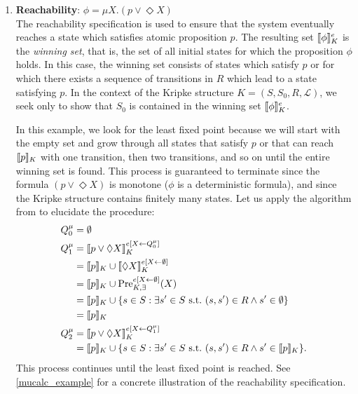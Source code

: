 \begin{enumerate}[label = (\roman*)]
    \item \textbf{Reachability}: $\phi = \mu X.(p \lor \Diamond X)$\label{reachability_example} \\
        The reachability specification is used to ensure that the system eventually reaches a state which satisfies atomic proposition $p$. The resulting set $\brackets{\phi}_K^e$ is the {\em winning set}, that is, the set of all initial states for which the proposition $\phi$ holds. In this case, the winning set consists of states which satisfy $p$ or for which there exists a sequence of transitions in $R$ which lead to a state satisfying $p$. In the context of the Kripke structure $K = (S,S_0,R,\mathcal{L})$, we seek only to show that $S_0$ is contained in the winning set $\brackets{\phi}_K^e$.

        In this example, we look for the least fixed point because we will start with the empty set and grow through all states that satisfy $p$ or that can reach $\brackets{p}_K$ with one transition, then two transitions, and so on until the entire winning set is found. This process is guaranteed to terminate since the formula $(p \lor \Diamond X)$ is monotone ($\phi$ is a deterministic \mucalc{} formula), and since the Kripke structure contains finitely many states. Let us apply the algorithm from  to elucidate the procedure:
        \begin{align*}
            Q_0^\mu &= \emptyset \\
            Q_1^\mu &= \brackets{p \lor \Diamond X}_K^{e[X \leftarrow Q_0^\mu]} \\
                    &= \brackets{p}_K \cup \brackets{\Diamond X}_K^{e[X \leftarrow \emptyset]}\\
                    &= \brackets{p}_K \cup \Pree[{e[X \leftarrow \emptyset]}]{X} \\
                    &= \brackets{p}_K \cup \{ s \in S : \exists s' \in S \ \text{s.t.} \ (s,s') \in R   \land s' \in \emptyset \} \\
                    &= \brackets{p}_K\\
            Q_2^\mu &= \brackets{p \lor \Diamond X}_K^{e[X \leftarrow Q_1^\mu]} \\
                    &= \brackets{p}_K \cup \{ s \in S : \exists s' \in S \ \text{s.t.} \ (s,s') \in R \land s' \in \brackets{p}_K \}.
        \end{align*}
        This process continues until the least fixed point is reached. See \autoref{mucalc_example} for a concrete illustration of the reachability specification.


\end{enumerate}
